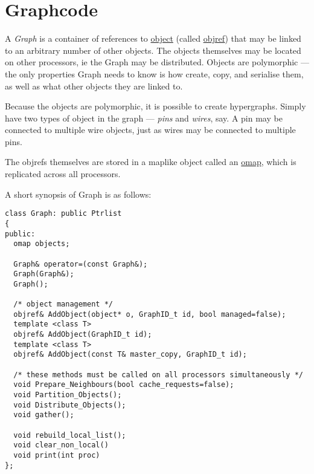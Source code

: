 \section{Graphcode}\label{graphcode}

A {\em Graph} is a container of references to
\hyperref{{\em objects}}{ (\S}{)}{object}
(called \hyperref{{\em objrefs}}{
    (\S}{)}{objref}) that may be linked to an arbitrary
  number of other objects. The objects themselves may be located on
  other processors, ie the Graph may be distributed. Objects are
  polymorphic --- the only properties Graph needs to know is how
  create, copy, and serialise them, as well as what other objects they
  are linked to.

Because the objects are polymorphic, it is possible to create
hypergraphs. Simply have two types of object in the graph --- {\em
  pins} and {\em wires}, say. A pin may be connected to multiple wire
objects, just as wires may be connected to multiple pins.

The objrefs themselves are stored in a maplike object called an
\hyperref{{\em omap}}{ (\S}{)}{omap}, which is replicated
across all processors. 

A short synopsis of Graph is as follows:
\begin{verbatim}
class Graph: public Ptrlist
{
public:
  omap objects;

  Graph& operator=(const Graph&);
  Graph(Graph&);
  Graph();

  /* object management */
  objref& AddObject(object* o, GraphID_t id, bool managed=false); 
  template <class T>
  objref& AddObject(GraphID_t id); 
  template <class T>
  objref& AddObject(const T& master_copy, GraphID_t id); 

  /* these methods must be called on all processors simultaneously */
  void Prepare_Neighbours(bool cache_requests=false);
  void Partition_Objects();
  void Distribute_Objects();
  void gather();

  void rebuild_local_list();   
  void clear_non_local()
  void print(int proc) 
};                 

\end{verbatim}


